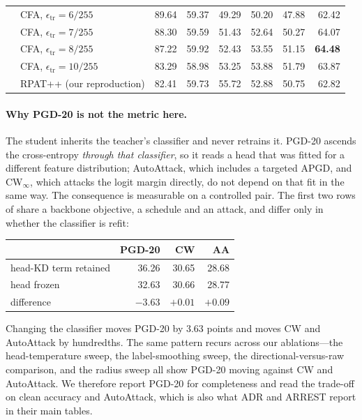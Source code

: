 \begin{table}[!htbp]
\begin{tabular}{llrrrrrr}
              & CFA, $\epsilon_{\mathrm{tr}} = 6/255$  & 89.64 & 59.37 & 49.29 & 50.20 & 47.88 & 62.42 \\
              & CFA, $\epsilon_{\mathrm{tr}} = 7/255$  & 88.30 & 59.59 & 51.43 & 52.64 & 50.27 & 64.07 \\
              & CFA, $\epsilon_{\mathrm{tr}} = 8/255$  & 87.22 & 59.92 & 52.43 & 53.55 & 51.15 & \textbf{64.48} \\
              & CFA, $\epsilon_{\mathrm{tr}} = 10/255$ & 83.29 & 58.98 & 53.25 & 53.88 & 51.79 & 63.87 \\
              & RPAT++ (our reproduction)    & 82.41 & 59.73 & 55.72 & 52.88 & 50.75 & 62.82 \\
    \bottomrule
  \end{tabular}
\end{table}

\paragraph{Why PGD-20 is not the metric here.} The student inherits the teacher's classifier and never
retrains it. PGD-20 ascends the cross-entropy \emph{through that classifier}, so it reads a head that
was fitted for a different feature distribution; AutoAttack, which includes a targeted APGD, and
CW$_\infty$, which attacks the logit margin directly, do not depend on that fit in the same way. The
consequence is measurable on a controlled pair. The first two rows of  share a
backbone objective, a schedule and an attack, and differ only in whether the classifier is refit:

\begin{center}
\begin{tabular}{lrrr}
  \toprule
  & PGD-20 & CW & AA \\
  \midrule
  head-KD term retained & 36.26 & 30.65 & 28.68 \\
  head frozen           & 32.63 & 30.66 & 28.77 \\
  \midrule
  difference            & $-3.63$ & $+0.01$ & $+0.09$ \\
  \bottomrule
\end{tabular}
\end{center}

Changing the classifier moves PGD-20 by $3.63$ points and moves CW and AutoAttack by hundredths. The
same pattern recurs across our ablations---the head-temperature sweep, the label-smoothing sweep, the
directional-versus-raw comparison, and the radius sweep all show PGD-20 moving against CW and
AutoAttack. We therefore report PGD-20 for completeness and read the trade-off on clean accuracy and
AutoAttack, which is also what ADR and ARREST report in their main tables.

